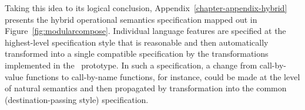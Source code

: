 Taking this idea to its logical conclusion,
Appendix~\ref{chapter-appendix-hybrid} presents the hybrid 
operational semantics specification
mapped out in Figure~\ref{fig:modularcompose}. Individual language
features are specified at the highest-level specification style
that is reasonable and then automatically transformed into a single
compatible specification by the transformations implemented
in the \sls~prototype. In such a specification, a change from
call-by-value functions to call-by-name functions, for instance, could
be made at the level of natural semantics and then propagated by
transformation into the common (destination-passing style)
specification.



